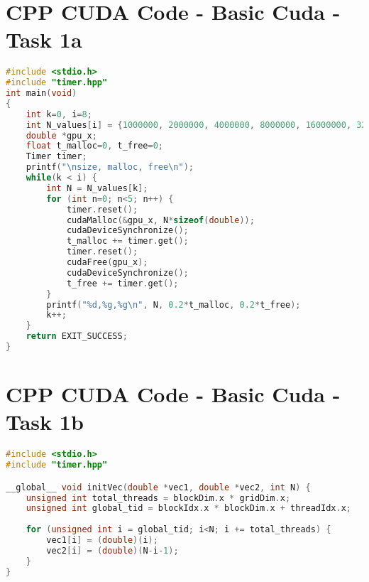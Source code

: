\begin{appendix}
\addappheadtotoc
\section{CPP CUDA Code - Basic Cuda - Task 1a}
\label{app_1a}

\begin{lstlisting}[language=C++, title=C++ Listing]
#include <stdio.h>
#include "timer.hpp"
int main(void)
{
	int k=0, i=8;
	int N_values[i] = {1000000, 2000000, 4000000, 8000000, 16000000, 32000000, 64000000, 128000000};
	double *gpu_x;
	float t_malloc=0, t_free=0;
	Timer timer;
	printf("\nsize, malloc, free\n");
	while(k < i) {
		int N = N_values[k];
		for (int n=0; n<5; n++) {
			timer.reset();
			cudaMalloc(&gpu_x, N*sizeof(double)); 
			cudaDeviceSynchronize();
			t_malloc += timer.get();
			timer.reset();
			cudaFree(gpu_x);
			cudaDeviceSynchronize();
			t_free += timer.get();
		} 
		printf("%d,%g,%g\n", N, 0.2*t_malloc, 0.2*t_free);
		k++;
	}
	return EXIT_SUCCESS;
}
\end{lstlisting}
\pagebreak

\section{CPP CUDA Code - Basic Cuda - Task 1b}
\label{app_1b}
\begin{lstlisting}[language=C++, title=C++ Listing]
#include <stdio.h>
#include "timer.hpp"

__global__ void initVec(double *vec1, double *vec2, int N) {
	unsigned int total_threads = blockDim.x * gridDim.x;
	unsigned int global_tid = blockIdx.x * blockDim.x + threadIdx.x;
	
	for (unsigned int i = global_tid; i<N; i += total_threads) {
		vec1[i] = (double)(i);
		vec2[i] = (double)(N-i-1);
	}
}


\end{lstlisting}
\end{appendix}
